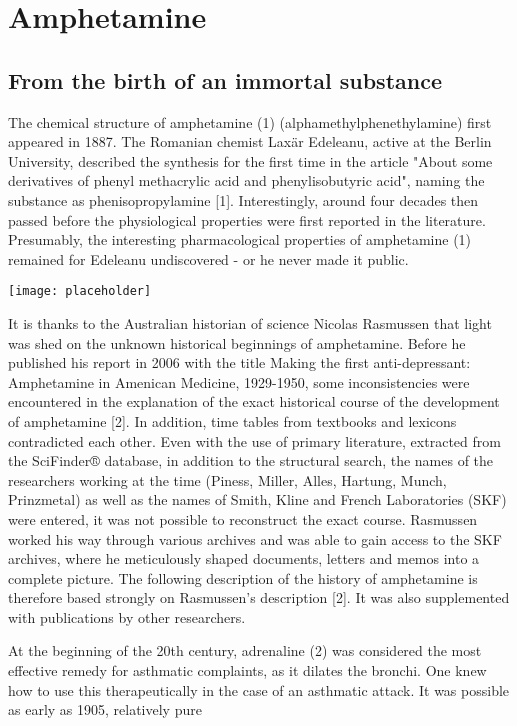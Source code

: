 \chapter{Amphetamine}
\section{From the birth of an immortal substance}

The chemical structure of amphetamine (1) (alphamethylphenethylamine) first appeared in 1887. The Romanian chemist Laxär Edeleanu, active at the Berlin University, described the synthesis for the first time in the article "About some derivatives of phenyl methacrylic acid and phenylisobutyric acid", naming the substance as phenisopropylamine [1]. Interestingly, around four decades then passed before the physiological properties were first reported in the literature. Presumably, the interesting pharmacological properties of amphetamine (1) remained for Edeleanu undiscovered - or he never made it public.

\texttt{[image: placeholder]}

It is thanks to the Australian historian of science Nicolas Rasmussen that light was shed on the unknown historical beginnings of amphetamine. Before he published his report in 2006 with the title Making the first anti-depressant: Amphetamine in Amenican Medicine, 1929-1950, some inconsistencies were encountered in the explanation of the exact historical course of the development of amphetamine [2]. In addition, time tables from textbooks and lexicons contradicted each other. Even with the use of primary literature, extracted from the SciFinder® database, in addition to the structural search, the names of the researchers working at the time (Piness, Miller, Alles, Hartung, Munch, Prinzmetal) as well as the names of Smith, Kline and French Laboratories (SKF) were entered, it was not possible to reconstruct the exact course. Rasmussen worked his way through various archives and was able to gain access to the SKF archives, where he meticulously shaped documents, letters and memos into a complete picture. The following description of the history of amphetamine is therefore based strongly on Rasmussen's description [2]. It was also supplemented with publications by other researchers.
\bigbreak

At the beginning of the 20th century, adrenaline (2) was considered the most effective remedy for asthmatic complaints, as it dilates the bronchi. One knew how to use this therapeutically in the case of an asthmatic attack. It was possible as early as 1905, relatively pure

